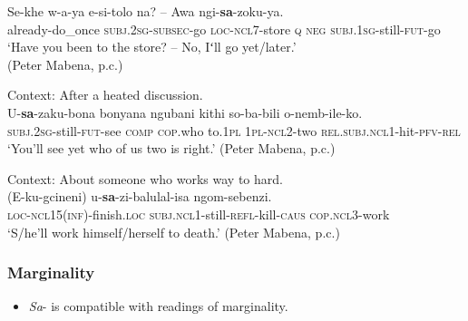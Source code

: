 \begin{exe}
	\ex
	\gll Se-khe w-a-ya e-si-tolo na? – Awa ngi-\textbf{sa}-zoku-ya.\\
	already-do\_once \textsc{subj}.2\textsc{sg}-\textsc{subsec}-go \textsc{loc}-\textsc{ncl}7-store \textsc{q}  {} \textsc{neg} \textsc{subj}.1\textsc{sg}-still-\textsc{fut}-go\\
	\glt \lq Have you been to the store? -- No, Iʻll go yet/later.'
	\\(Peter Mabena, p.c.)
	
	\ex Context: After a heated discussion.\\
	\gll U-\textbf{sa}-zaku-bona bonyana ngubani kithi so-ba-bili o-nemb-ile-ko.\\
	\textsc{subj}.2\textsc{sg}-still-\textsc{fut-}see \textsc{comp} \textsc{cop}.who to.1\textsc{pl} 1\textsc{pl}-\textsc{ncl}2-two  \textsc{rel}.\textsc{subj}.\textsc{ncl}1-hit-\textsc{pfv}-\textsc{rel}\\
	\glt \lq You'll see yet who of us two is right.' (Peter Mabena, p.c.)
	
	\ex Context: About someone who works way to hard.\\
	\gll (E-ku-gcineni) u-\textbf{sa}-zi-balulal-isa ngom-sebenzi.\\	
	\phantom{(}\textsc{loc}-\textsc{ncl}15(\textsc{inf})-finish.\textsc{loc} \textsc{subj}.\textsc{ncl}1-still-\textsc{refl}-kill-\textsc{caus} \textsc{cop}.\textsc{ncl}3-work\\
	\glt \lq S/he'll work himself/herself to death.' (Peter Mabena, p.c.)
\end{exe}



\subsubsection{Marginality}
\label{appendixSouthernNdebeleMarginal}
\begin{itemize}
	\item \textit{Sa}- is compatible with readings of marginality.
\end{itemize}

